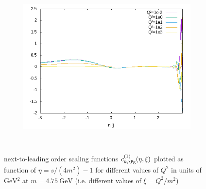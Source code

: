 \begin{figure}[ht!]
\begin{subfigure}[t]{.3\textwidth}
\end{subfigure}%
\begin{subfigure}[t]{.3\textwidth}
	\includegraphics[width=\textwidth]{../../img2/partonic/cg1_AA_x2g1}
\end{subfigure}\\%
\caption{next-to-leading order scaling functions $c_{k,\Pg}^{(1)}(\eta,\xi)$ plotted as function of $\eta=s/(4m^2)-1$ for different values of $Q^2$ in units of $\si{\GeV^2}$ at $m=\SI{4.75}{\GeV}$ (i.e. different values of $\xi=Q^2/m^2$) }\label{fig:cg0}
\end{figure}
